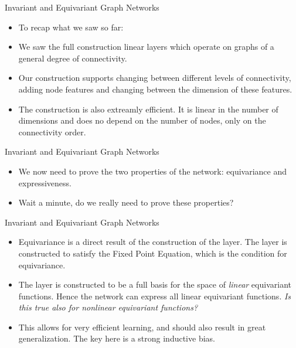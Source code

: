 \documentclass{beamer}
\begin{document}
\begin{frame}{Invariant and Equivariant Graph Networks}
    \begin{itemize}
        \setlength{\itemsep}{\fill}
        \item To recap what we saw so far:
        \item We saw the full construction linear layers which operate on graphs of a general degree of connectivity.
        \item Our construction supports changing between different levels of connectivity, adding node features and changing between the dimension of these features.
        \item The construction is also extreamly efficient. It is linear in the number of dimensions and does no depend on the number of nodes, only on the connectivity order.
    \end{itemize}
\end{frame}
\begin{frame}{Invariant and Equivariant Graph Networks}
    \begin{itemize}
        \setlength{\itemsep}{\fill}    
        \item We now need to prove the two properties of the network: equivariance and expressiveness.
        \item Wait a minute, do we really need to prove these properties?
        
    \end{itemize}
\end{frame}
\begin{frame}{Invariant and Equivariant Graph Networks}
    \begin{itemize}
        \setlength{\itemsep}{\fill}
        \item Equivariance is a direct result of the construction of the layer. The layer is constructed to satisfy the Fixed Point Equation, which is the condition for equivariance. \pause
        \item The layer is constructed to be a full basis for the space of \textit{linear} equivariant functions. Hence the network can express all linear equivariant functions. \textit{Is this true also for nonlinear equivariant functions?} \pause    
        \item This allows for very efficient learning, and should also result in great generalization. The key here is a strong inductive bias.
    \end{itemize}
\end{frame}
\end{document}
